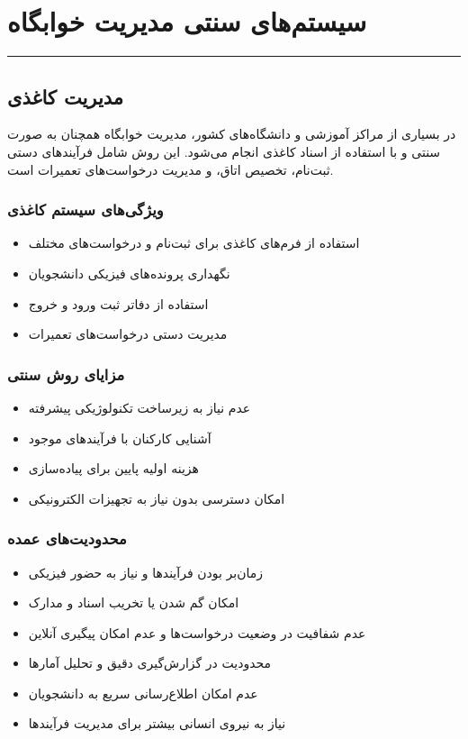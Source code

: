 \documentclass[12pt,a4paper]{report}
\begin{document}
	\section{سیستم‌های سنتی مدیریت خوابگاه}
	
	\noindent\rule{\textwidth}{0.4pt}
	
	\subsection{مدیریت کاغذی}
	
	در بسیاری از مراکز آموزشی و دانشگاه‌های کشور، مدیریت خوابگاه همچنان به صورت سنتی و با استفاده از اسناد کاغذی انجام می‌شود. این روش شامل فرآیندهای دستی ثبت‌نام، تخصیص اتاق، و مدیریت درخواست‌های تعمیرات است.
	
	\subsubsection*{ویژگی‌های سیستم کاغذی}
	\begin{itemize}
		\item استفاده از فرم‌های کاغذی برای ثبت‌نام و درخواست‌های مختلف
		\item نگهداری پرونده‌های فیزیکی دانشجویان
		\item استفاده از دفاتر ثبت ورود و خروج
		\item مدیریت دستی درخواست‌های تعمیرات
	\end{itemize}
	
	\subsubsection*{مزایای روش سنتی}
	\begin{itemize}
		\item عدم نیاز به زیرساخت تکنولوژیکی پیشرفته
		\item آشنایی کارکنان با فرآیندهای موجود
		\item هزینه اولیه پایین برای پیاده‌سازی
		\item امکان دسترسی بدون نیاز به تجهیزات الکترونیکی
	\end{itemize}
	
	\subsubsection*{محدودیت‌های عمده}
	\begin{itemize}
		\item زمان‌بر بودن فرآیندها و نیاز به حضور فیزیکی
		\item امکان گم شدن یا تخریب اسناد و مدارک
		\item عدم شفافیت در وضعیت درخواست‌ها و عدم امکان پیگیری آنلاین
		\item محدودیت در گزارش‌گیری دقیق و تحلیل آمارها
		\item عدم امکان اطلاع‌رسانی سریع به دانشجویان
		\item نیاز به نیروی انسانی بیشتر برای مدیریت فرآیندها
	\end{itemize}
	
\end{document}
